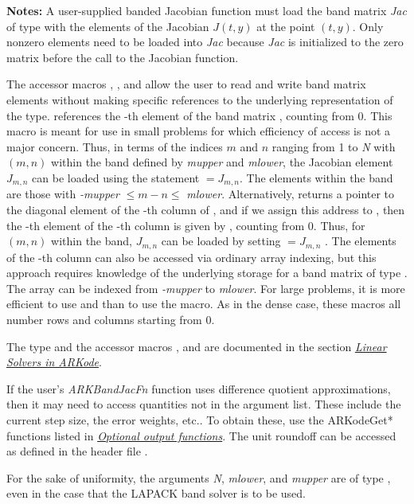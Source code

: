 \documentclass[letterpaper,10pt,english]{sphinxmanual}
\begin{document}
\begin{fulllineitems}
\textbf{Notes:} A user-supplied banded Jacobian function must load the band
matrix \emph{Jac} of type  with the elements of the Jacobian
$J(t,y)$ at the point $(t,y)$. Only nonzero elements
need to be loaded into \emph{Jac} because \emph{Jac} is initialized to
the zero matrix before the call to the Jacobian function.

The accessor macros , , and
 allow the user to read and write band matrix
elements without making specific references to the underlying
representation of the  type.  
references the -th element of the band matrix ,
counting from 0. This macro is meant for use in small problems for
which efficiency of access is not a major concern. Thus, in terms
of the indices $m$ and $n$ ranging from 1 to \emph{N} with
$(m, n)$ within the band defined by \emph{mupper} and
\emph{mlower}, the Jacobian element $J_{m,n}$ can be loaded
using the statement  $=
J_{m,n}$. The elements within the band are those with \emph{-mupper}
$\le m-n \le$ \emph{mlower}.  Alternatively, 
returns a pointer to the diagonal element of the -th column of
, and if we assign this address to , then
the -th element of the -th column is given by
, counting from 0. Thus, for
$(m,n)$ within the band, $J_{m,n}$ can be loaded by
setting  $= J_{m,n}$ . The elements of the -th column can
also be accessed via ordinary array indexing, but this approach
requires knowledge of the underlying storage for a band matrix of
type . The array  can be indexed from
\emph{-mupper} to \emph{mlower}. For large problems, it is more efficient
to use  and  than to use the
 macro. As in the dense case, these macros all number
rows and columns starting from 0.

The  type and the accessor macros ,
 and  are documented in the section
{\hyperref[linear_solvers/index:linearsolvers]{\emph{Linear Solvers in ARKode}}}.

If the user's \emph{ARKBandJacFn} function uses difference quotient
approximations, then it may need to access quantities not in the
argument list.  These include the current step size, the error
weights, etc.. To obtain these, use the ARKodeGet* functions
listed in {\hyperref[c_interface/User_callable:cinterface-optionaloutputs]{\emph{Optional output functions}}}. The unit roundoff
can be accessed as  defined in the header file
.

For the sake of uniformity, the arguments \emph{N}, \emph{mlower}, and
\emph{mupper} are of type , even in the case that the
LAPACK band solver is to be used.

\end{fulllineitems}
\end{document}

